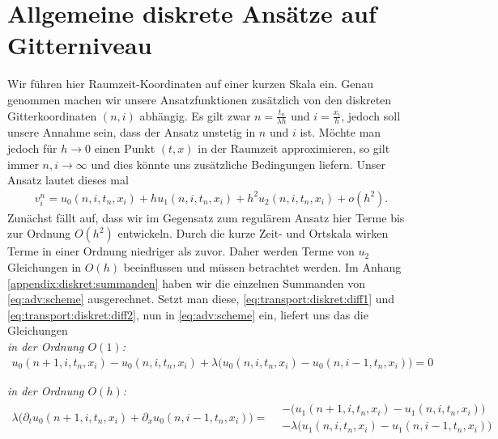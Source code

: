 \section {Allgemeine diskrete Ansätze auf Gitterniveau} \label{sec:transport:diskret}

Wir führen hier Raumzeit-Koordinaten auf einer kurzen Skala ein.
Genau genommen machen wir unsere Ansatzfunktionen zusätzlich von den diskreten Gitterkoordinaten $(n,i)$ abhängig.
Es gilt zwar $n = \frac {t_n} {\lambda h}$ und $i = \frac {x_i}{h}$, jedoch soll unsere Annahme sein, dass der Ansatz unstetig in $n$ und $i$ ist.
Möchte man jedoch für $h \to 0$ einen Punkt $(t,x)$ in der Raumzeit approximieren, so gilt immer $n,i \to \infty$ und dies könnte uns zusätzliche Bedingungen liefern.
Unser Ansatz lautet dieses mal
\begin{align}\label{eq:transport:diskret:ansatz}
v^n_i = u_0(n, i, t_n, x_i) + h u_1(n, i, t_n, x_i) + h^2 u_2(n, i, t_n, x_i) + o(h^2).
\end{align}
Zunächst fällt auf, dass wir im Gegensatz zum regulärem Ansatz hier Terme bis zur Ordnung $O(h^2)$ entwickeln.
Durch die kurze Zeit- und Ortskala wirken Terme in einer Ordnung niedriger als zuvor.
Daher werden Terme von $u_2$ Gleichungen in $O(h)$ beeinflussen und müssen betrachtet werden.
Im Anhang \ref{appendix:diskret:summanden} haben wir die einzelnen Summanden von \eqref{eq:adv:scheme} ausgerechnet.
Setzt man diese, \eqref{eq:transport:diskret:diff1} und \eqref{eq:transport:diskret:diff2}, nun in \eqref{eq:adv:scheme} ein, liefert uns das die Gleichungen
\\

\noindent \emph{in der Ordnung $O(1)$:}
\begin{align}\label{eq:transport:diskret:o1}
u_0(n+1, i, t_n, x_i) - u_0(n, i, t_n, x_i)
+ \lambda \bigl(u_0(n, i, t_n, x_i) - u_0(n, i-1, t_n, x_i) \bigr) = 0
\end{align}

\noindent \emph{in der Ordnung $O(h)$:}
\begin{align}\label{eq:transport:diskret:oh}
\lambda \bigl( \partial_t u_0(n+1, i, t_n, x_i) + \partial_x u_0(n, i-1, t_n, x_i) \bigr) =
\begin{split}
&- \bigl( u_1(n+1, i, t_n, x_i) - u_1(n, i, t_n, x_i) \bigr)\\
&- \lambda \bigl(u_1(n, i, t_n, x_i) - u_1(n, i-1, t_n, x_i) \bigr)
\end{split}
\end{align}

